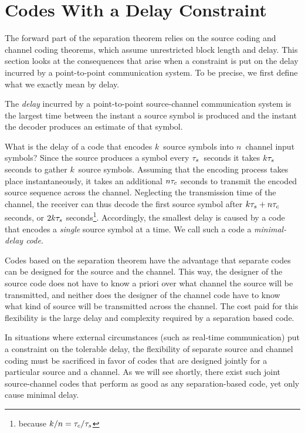 \section{Codes With a Delay Constraint}\label{sec:delayconstraint}

The forward part of the separation theorem relies on the source coding and
channel coding theorems, which assume unrestricted block length and
delay. This section looks at the consequences that arise when a
constraint is put on the delay incurred by a point-to-point communication
system. To be precise, we first define what we exactly mean by delay.

\begin{definition}
  \label{def:delay}
  The \emph{delay} incurred by a point-to-point source-channel communication
  system is the largest time between the instant a source symbol is produced and
  the instant the decoder produces an estimate of that symbol. 
\end{definition}

What is the delay of a code that encodes $k$~source symbols into $n$~channel
input symbols? Since the source produces a symbol every ${\tau_s}$~seconds it takes
$k{\tau_s}$ seconds to gather $k$~source symbols. Assuming that the encoding process
takes place instantaneously, it takes an additional $n{\tau_c}$ seconds to transmit
the encoded source sequence across the channel. Neglecting the transmission time
of the channel, the receiver can thus decode the first source symbol after $k{\tau_s}
+ n {\tau_c}$ seconds, or $2k{\tau_s}$ seconds\footnote{because $k/n = {\tau_c}/{\tau_s}$}.
Accordingly, the smallest delay is caused by a code that encodes a \emph{single}
source symbol at a time. We call such a code a \emph{minimal-delay code}.

Codes based on the separation theorem have the advantage that separate codes can
be designed for the source and the channel. This way, the designer of the source
code does not have to know a priori over what channel the source will be
transmitted, and neither does the designer of the channel code have to know what
kind of source will be transmitted across the channel. The cost paid for this
flexibility is the large delay and complexity required by a separation based
code. 

In situations where external circumstances (such as real-time communication) put
a constraint on the tolerable delay, the flexibility of separate source and
channel coding must be sacrificed in favor of codes that are designed jointly
for a particular source and a channel. As we will see shortly, there exist such
joint source-channel codes that perform as good as any separation-based code,
yet only cause minimal delay.

